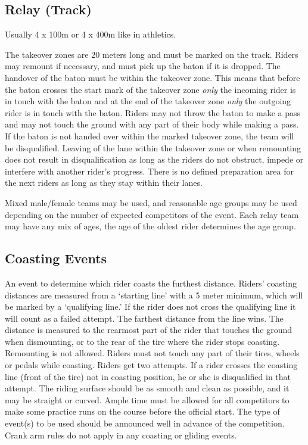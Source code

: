 \subsection{Relay (Track)}
Usually 4 x 100m or 4 x 400m like in athletics.

The takeover zones are 20 meters long and must be marked on the track.
Riders may remount if necessary, and must pick up the baton if it is dropped.
The handover of the baton must be within the takeover zone.
This means that before the baton crosses the start mark of the takeover zone \emph{only} the incoming rider is in touch with the baton and at the end of the takeover zone \emph{only} the outgoing rider is in touch with the baton.
Riders may not throw the baton to make a pass and may not touch the ground with any part of their body while making a pass.
If the baton is not handed over within the marked takeover zone, the team will be disqualified.
Leaving of the lane within the takeover zone or when remounting does not result in disqualification as long as the riders do not obstruct, impede or interfere with another rider's progress.
There is no defined preparation area for the next riders as long as they stay within their lanes.

Mixed male/female teams may be used, and reasonable age groups may be used depending on the number of expected competitors of the event.
Each relay team may have any mix of ages, the age of the oldest rider determines the age group.

\subsection{Coasting Events \label{sec:track-field_coasting-events}}
An event to determine which rider coasts the furthest distance.
Riders' coasting distances are measured from a `starting line' with a 5 meter minimum, which will be marked by a `qualifying line.'
If the rider does not cross the qualifying line it will count as a failed attempt.
The farthest distance from the line wins.
The distance is measured to the rearmost part of the rider that touches the ground when dismounting, or to the rear of the tire where the rider stops coasting.
Remounting is not allowed.
Riders must not touch any part of their tires, wheels or pedals while coasting.
Riders get two attempts.
If a rider crosses the coasting line (front of the tire) not in coasting position, he or she is disqualified in that attempt.
The riding surface should be as smooth and clean as possible, and it may be straight or curved.
Ample time must be allowed for all competitors to make some practice runs on the course before the official start.
The type of event(s) to be used should be announced well in advance of the competition.
Crank arm rules do not apply in any coasting or gliding events.

